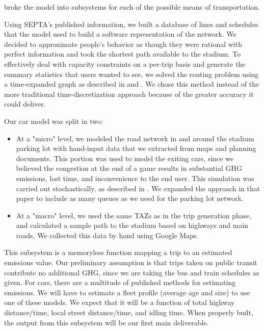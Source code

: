 \begin{description}[style=nextline]
  broke the model into subsystems for each of the possible means
  of transportation.
    \begin{description}[style=nextline]
        \item[SEPTA] Using SEPTA's published information, we built a
      database of lines and schedules that the model used to build
      a software representation of the network. We decided to
      approximate people's behavior as though they were rational with
      perfect information and took the shortest path available to the
      stadium. To effectively deal with capacity constraints on a
      per-trip basis and generate the summary statistics that users
      wanted to see, we solved the routing problem using a
      time-expanded graph as described in \cite{george2008time} and
      \cite{schulz2000dijkstra}. We chose this method instead of the
      more traditional time-discretization approach because of the
      greater accuracy it could deliver.
        \item[Cars] Our car model was split in two: \label{cars}
      \begin{itemize}
          \item At a "micro" level, we modeled the road network in and
        around the stadium parking lot with hand-input data that we
        extracted from maps and planning documents. This portion was
        used to model the exiting cars, since we believed the
        congestion at the end of a game results in substantial GHG
        emissions, lost time, and inconvenience to the end user. This
        simulation was carried out stochastically, as described in
        \cite{van2007modeling}. We expanded the approach in that paper
        to include as many queues as we need for the parking lot
        network.
          \item At a "macro" level, we used the same TAZs as in the
        trip generation phase, and calculated a sample path to the
        stadium based on highways and main roads. We collected this
        data by hand using Google Maps.
      \end{itemize}
    \end{description}
      \item[GHG Calculator] This subsystem is a memoryless
    function mapping a trip to an estimated emissions value. Our
    preliminary assumption is that trips taken on public transit
    contribute no additional GHG, since we are taking the bus and
    train schedules as given. For cars, there are a multitude of
    published methods for estimating emissions. We will have to
    estimate a fleet profile (average age and size) to use one of
    these models. We expect that it will be a function of total
    highway distance/time, local street distance/time, and idling
    time. When properly built, the output from this subsystem will be
    our first main deliverable.
\end{description}


